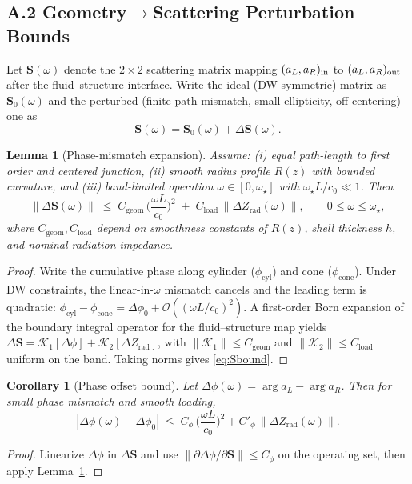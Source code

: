 \documentclass[11pt]{article}
\newtheorem{lemma}{Lemma}
\newtheorem{corollary}{Corollary}
\begin{document}
\subsection*{A.2 Geometry$\to$Scattering Perturbation Bounds}
Let $\mathbf S(\omega)$ denote the $2\times 2$ scattering matrix mapping $(a_L,a_R)_{\rm in}$ to $(a_L,a_R)_{\rm out}$ after the fluid–structure interface. Write the ideal (DW-symmetric) matrix as $\mathbf S_0(\omega)$ and the perturbed (finite path mismatch, small ellipticity, off-centering) one as
\[
\mathbf S(\omega)=\mathbf S_0(\omega)+\Delta \mathbf S(\omega).
\]
\begin{lemma}[Phase-mismatch expansion]
\label{lem:phase_mismatch}
Assume: (i) equal path-length to first order and centered junction, (ii) smooth radius profile $R(z)$ with bounded curvature, and (iii) band-limited operation $\omega\in[0,\omega_\star]$ with $\omega_\star L/c_0\ll 1$. Then
\begin{equation}
\|\Delta \mathbf S(\omega)\| \;\le\; C_{\mathrm{geom}}\,\Big(\frac{\omega L}{c_0}\Big)^2 \;+\; C_{\mathrm{load}}\,\|\Delta Z_{\mathrm{rad}}(\omega)\|,
\qquad 0\le\omega\le \omega_\star,
\label{eq:Sbound}
\end{equation}
where $C_{\mathrm{geom}},C_{\mathrm{load}}$ depend on smoothness constants of $R(z)$, shell thickness $h$, and nominal radiation impedance.
\end{lemma}
\begin{proof}
Write the cumulative phase along cylinder ($\phi_{\mathrm{cyl}}$) and cone ($\phi_{\mathrm{cone}}$). Under DW constraints, the linear-in-$\omega$ mismatch cancels and the leading term is quadratic: $\phi_{\mathrm{cyl}}-\phi_{\mathrm{cone}}=\Delta\phi_0 + \mathcal O((\omega L/c_0)^2)$. A first-order Born expansion of the boundary integral operator for the fluid–structure map yields $\Delta \mathbf S=\mathcal K_1[\Delta \phi]+\mathcal K_2[\Delta Z_{\mathrm{rad}}]$, with $\|\mathcal K_1\|\le C_{\mathrm{geom}}$ and $\|\mathcal K_2\|\le C_{\mathrm{load}}$ uniform on the band. Taking norms gives \eqref{eq:Sbound}.
\end{proof}

\begin{corollary}[Phase offset bound]
\label{cor:phase_offset}
Let $\Delta\phi(\omega)=\arg a_L-\arg a_R$. Then for small phase mismatch and smooth loading,
\begin{equation}
|\Delta\phi(\omega) - \Delta\phi_0|\;\le\; C_\phi\,\Big(\frac{\omega L}{c_0}\Big)^2 + C'_\phi\,\|\Delta Z_{\mathrm{rad}}(\omega)\|.
\label{eq:phaseBound}
\end{equation}
\end{corollary}
\begin{proof}
Linearize $\Delta\phi$ in $\Delta \mathbf S$ and use $\|\partial \Delta\phi/\partial \mathbf S\|\le C_\phi$ on the operating set, then apply Lemma~\ref{lem:phase_mismatch}.
\end{proof}
\end{document}
